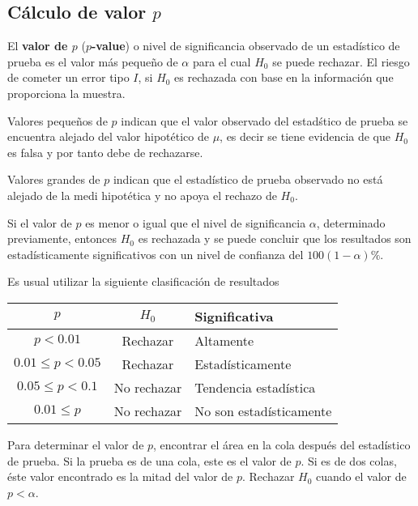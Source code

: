 \subsection*{C\'alculo de valor $p$}
\begin{Def}
El \textbf{valor de $p$} (\textbf{$p$-value}) o nivel de significancia observado de un estad\'istico de prueba es el valor m\'as peque\~ no de $\alpha$ para el cual $H_{0}$ se puede rechazar. El riesgo de cometer un error tipo $I$, si $H_{0}$ es rechazada con base en la informaci\'on que proporciona la muestra.
\end{Def}

\begin{Note}
Valores peque\~ nos de $p$ indican 	que el valor observado del estad\'stico de prueba se encuentra alejado del valor hipot\'etico de $\mu$, es decir se tiene evidencia de que $H_{0}$ es falsa y por tanto debe de rechazarse.
\end{Note}

\begin{Note}
Valores grandes de $p$ indican que el estad\'istico de prueba observado no est\'a alejado de la medi hipot\'etica y no apoya el rechazo de $H_{0}$.
\end{Note}

\begin{Def}
Si el valor de $p$ es menor o igual que el nivel de significancia $\alpha$, determinado previamente, entonces $H_{0}$ es rechazada y se puede concluir que los resultados son estad\'isticamente significativos con un nivel de confianza del $100\left(1-\alpha\right)\%$.
\end{Def}
Es usual utilizar la siguiente clasificaci\'on de resultados

\begin{tabular}{|c||c|l|}\hline
$p$& $H_{0}$&Significativa\\\hline\hline
$p<0.01$&Rechazar &Altamente\\\hline
$0.01\leq p<0.05$ & Rechazar&Estad\'isticamente\\\hline
$0.05\leq p <0.1$ & No rechazar & Tendencia estad\'istica\\\hline
$0.01\leq p$ & No rechazar & No son estad\'isticamente\\\hline
\end{tabular}

\begin{Note}
Para determinar el valor de $p$, encontrar el \'area en la cola despu\'es del estad\'istico de prueba. Si la prueba es de una cola, este es el valor de $p$. Si es de dos colas, \'este valor encontrado es la mitad del valor de $p$. Rechazar $H_{0}$ cuando el valor de $p<\alpha$.
\end{Note}

